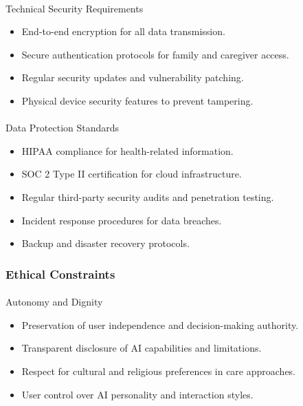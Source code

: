 \documentclass[
  letterpaper,
  DIV=11,
  numbers=noendperiod]{scrartcl}
\makeatletter
\let\oldparagraph\paragraph
\renewcommand{\paragraph}{
    \@ifstar
      \xxxParagraphStar
      \xxxParagraphNoStar
  }
\newcommand{\xxxParagraphStar}[1]{\oldparagraph*{#1}\mbox{}}
\newcommand{\xxxParagraphNoStar}[1]{\oldparagraph{#1}\mbox{}}
\providecommand{\tightlist}{%
  \setlength{\itemsep}{0pt}\setlength{\parskip}{0pt}}\usepackage{longtable,booktabs,array}
\makeatother
\begin{document}
\paragraph{Technical Security
Requirements}\label{technical-security-requirements}

\begin{itemize}
\tightlist
\item
  End-to-end encryption for all data transmission.
\item
  Secure authentication protocols for family and caregiver access.
\item
  Regular security updates and vulnerability patching.
\item
  Physical device security features to prevent tampering.
\end{itemize}

\paragraph{Data Protection Standards}\label{data-protection-standards}

\begin{itemize}
\tightlist
\item
  HIPAA compliance for health-related information.
\item
  SOC 2 Type II certification for cloud infrastructure.
\item
  Regular third-party security audits and penetration testing.
\item
  Incident response procedures for data breaches.
\item
  Backup and disaster recovery protocols.
\end{itemize}

\subsubsection{Ethical Constraints}\label{ethical-constraints}

\paragraph{Autonomy and Dignity}\label{autonomy-and-dignity}

\begin{itemize}
\tightlist
\item
  Preservation of user independence and decision-making authority.
\item
  Transparent disclosure of AI capabilities and limitations.
\item
  Respect for cultural and religious preferences in care approaches.
\item
  User control over AI personality and interaction styles.
\end{itemize}
\end{document}
